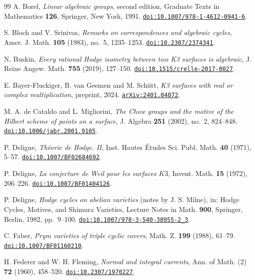 \begin{thebibliography}{99}
A. Borel,
\emph{Linear algebraic groups}, second edition,
Graduate Texts in Mathematics \textbf{126}, Springer, New York, 1991.
\href{https://doi.org/10.1007/978-1-4612-0941-6}{\nolinkurl{doi:10.1007/978-1-4612-0941-6}}.

S. Bloch and V. Srinivas,
\emph{Remarks on correspondences and algebraic cycles},
Amer. J. Math. \textbf{105} (1983), no.~5, 1235--1253.
\href{https://doi.org/10.2307/2374341}{\nolinkurl{doi:10.2307/2374341}}.

N. Buskin,
\emph{Every rational Hodge isometry between two K3 surfaces is algebraic},
J. Reine Angew. Math. \textbf{755} (2019), 127--150.
\href{https://doi.org/10.1515/crelle-2017-0027}{\nolinkurl{doi:10.1515/crelle-2017-0027}}.

E. Bayer-Fluckiger, B. van Geemen and M. Sch\"utt,
\emph{K3 surfaces with real or complex multiplication},
preprint, 2024.
\href{https://arxiv.org/abs/2401.04072}{\nolinkurl{arXiv:2401.04072}}.

M. A. de Cataldo and L. Migliorini,
\emph{The Chow groups and the motive of the Hilbert scheme of points on a
surface},
J. Algebra \textbf{251} (2002), no.~2, 824--848.
\href{https://doi.org/10.1006/jabr.2001.9105}{\nolinkurl{doi:10.1006/jabr.2001.9105}}.

P. Deligne,
\emph{Th\'eorie de Hodge. II},
Inst. Hautes \'Etudes Sci. Publ. Math. \textbf{40} (1971), 5--57.
\href{https://doi.org/10.1007/BF02684692}{\nolinkurl{doi:10.1007/BF02684692}}.

P. Deligne,
\emph{La conjecture de Weil pour les surfaces $K3$},
Invent. Math. \textbf{15} (1972), 206--226.
\href{https://doi.org/10.1007/BF01404126}{\nolinkurl{doi:10.1007/BF01404126}}.

P. Deligne,
\emph{Hodge cycles on abelian varieties} (notes by J. S. Milne),
in: Hodge Cycles, Motives, and Shimura Varieties,
Lecture Notes in Math. \textbf{900}, Springer, Berlin, 1982, pp.~9--100.
\href{https://doi.org/10.1007/978-3-540-38955-2_3}{\nolinkurl{doi:10.1007/978-3-540-38955-2_3}}.

C. Faber,
\emph{Prym varieties of triple cyclic covers},
Math. Z. \textbf{199} (1988), 61--79.
\href{https://doi.org/10.1007/BF01160210}{\nolinkurl{doi:10.1007/BF01160210}}.

H. Federer and W. H. Fleming,
\emph{Normal and integral currents},
Ann. of Math. (2) \textbf{72} (1960), 458--520.
\href{https://doi.org/10.2307/1970227}{\nolinkurl{doi:10.2307/1970227}}.


\end{thebibliography}
